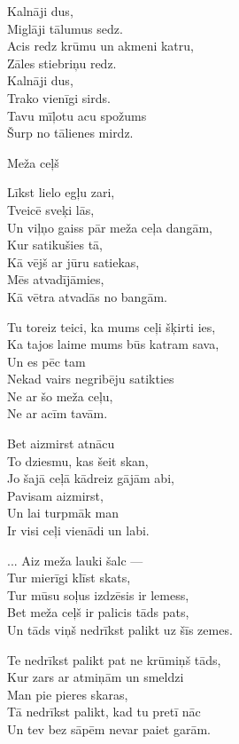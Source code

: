 \documentclass[14pt]{extarticle}
\begin{document}
{{Kalnāji dus,\\
Miglāji tālumus sedz.\\
Acis redz krūmu un akmeni katru,\\
Zāles stiebriņu redz.\\
Kalnāji dus,\\
Trako vienīgi sirds.\\
Tavu mīļotu acu spožums\\
Šurp no tālienes mirdz.

\newpage

{\large \sc Meža ceļš}

Līkst lielo egļu zari,\\
Tveicē sveķi lās,\\
Un viļņo gaiss pār meža ceļa dangām,\\
Kur satikušies tā,\\
Kā vējš ar jūru satiekas,\\
Mēs atvadījāmies,\\
Kā vētra atvadās no bangām.

Tu toreiz teici, ka mums ceļi šķirti ies,\\
Ka tajos laime mums būs katram sava,\\
Un es pēc tam\\
Nekad vairs negribēju satikties\\
Ne ar šo meža ceļu,\\
Ne ar acīm tavām. 

Bet aizmirst atnācu\\
To dziesmu, kas šeit skan,\\
Jo šajā ceļā kādreiz gājām abi,\\
Pavisam aizmirst,\\
Un lai turpmāk man\\
Ir visi ceļi vienādi un labi. 

... Aiz meža lauki šalc ---\\
Tur mierīgi klīst skats,\\
Tur mūsu soļus izdzēsis ir lemess,\\
Bet meža ceļš ir palicis tāds pats,\\
Un tāds viņš nedrīkst palikt uz šīs zemes. 

Te nedrīkst palikt pat ne krūmiņš tāds,\\
Kur zars ar atmiņām un smeldzi\\
Man pie pieres skaras,\\
Tā nedrīkst palikt, kad tu pretī nāc\\
Un tev bez sāpēm nevar paiet garām. 

}}
\end{document}
